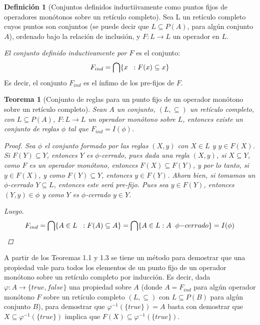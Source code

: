 \documentclass[11pt,oneside]{report}
\theoremstyle{plain}
\newtheorem{teo}{Teorema}[chapter]
\theoremstyle{definition}
\newtheorem{defi}{Definición}[chapter]
\begin{document}
\begin{defi}[Conjuntos definidos inductiivamente como puntos fijos de operadores monótonos sobre un retículo completo]
    Sea L un retículo completo cuyos puntos son conjuntos (se puede decir que $L\subseteq P(A)$, para algún conjunto $A$), ordenado bajo la relación de inclusión, y $F:L\rightarrow L$ un operador en $L$.

    \emph{El conjunto definido inductivamente por $F$} es el conjunto:
    $$F_{ind} = \bigcap \{x \hspace{2mm}:F(x)\subseteq x\}$$
    Es decir, el conjunto $F_{ind}$ es el ínfimo de los pre-fijos de $F$. %
\end{defi}

\begin{teo}[Conjunto de reglas para un punto fijo de un operador monótono sobre un retículo completo]
    Sean $A$ un conjunto, $(L, \subseteq)$ un retículo completo, con $L\subseteq P(A)$, $F: L \to L$ un operador monótono sobre $L$, entonces existe un conjunto de reglas $\phi$ tal que $F_{ind} = I(\phi)$.
    \begin{proof}
        Sea $\phi$ el conjunto formado por las reglas $(X,y)$ con $X \in L$ y $y \in F(X)$. Si $F(Y) \subseteq Y$, entonces $Y$ es $\phi$-cerrado, pues dada una regla $(X, y)$, si $X\subseteq Y$, como $F$ es un operador monótono, entonces $F(X) \subseteq F(Y)$, y por lo tanto, si $y\in F(X)$, y como $F(Y)\subseteq Y$, entonces $y\in F(Y)$.
        Ahora bien, si tomamos un $\phi$-cerrado $Y\subseteq L$, entonces este será pre-fijo. Pues sea $y \in F(Y)$, entonces $(Y,y)\in \phi$ y como $Y$ es $\phi$-cerrado $y \in Y$.

        Luego.
        $$F_{ind} = \bigcap \{A\in L \hspace{2mm}:F(A)\subseteq A\} = \bigcap \{A\in L : A \hspace{2mm}\phi{-cerrado}\} = I(\phi)$$
    \end{proof}
\end{teo}

A partir de los Teoremas 1.1 y 1.3 se tiene un método para demostrar que una propiedad vale para todos los elementos de un punto fijo de un operador monótono sobre un retículo completo por inducción. Es decir, dada $\varphi : A \to \{true, false\}$ una propiedad sobre $A$ (donde $A = F_{ind}$ para algún operador monótono $F$ sobre un retículo completo $(L,\subseteq)$ con $L\subseteq P(B)$ para algún conjunto $B$), para demostrar que $\varphi^{-1}(\{true\}) = A$ basta con demostrar que $X \subseteq \varphi^{-1}(\{true\})$ implica que $F(X) \subseteq \varphi^{-1}(\{true\})$.
\end{document}

